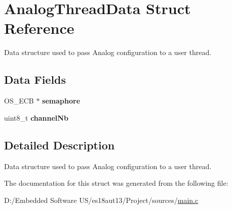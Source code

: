\hypertarget{struct_analog_thread_data}{}\section{Analog\+Thread\+Data Struct Reference}
\label{struct_analog_thread_data}


Data structure used to pass Analog configuration to a user thread.  


\subsection*{Data Fields}
\begin{DoxyCompactItemize}
\item 
\hypertarget{struct_analog_thread_data_a02d829e2506377585485044548fc85e2}{}O\+S\+\_\+\+E\+C\+B $\ast$ {\bfseries semaphore}\label{struct_analog_thread_data_a02d829e2506377585485044548fc85e2}

\item 
\hypertarget{struct_analog_thread_data_a896bcccdd678ec542be06dcb6cc91031}{}uint8\+\_\+t {\bfseries channel\+Nb}\label{struct_analog_thread_data_a896bcccdd678ec542be06dcb6cc91031}

\end{DoxyCompactItemize}


\subsection{Detailed Description}
Data structure used to pass Analog configuration to a user thread. 



The documentation for this struct was generated from the following file\+:\begin{DoxyCompactItemize}
\item 
D\+:/\+Embedded Software U\+S/es18aut13/\+Project/sources/\hyperlink{main_8c}{main.\+c}\end{DoxyCompactItemize}
